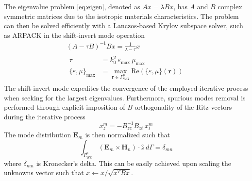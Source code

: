 \documentclass[journal,twoside,letterpaper]{IEEEtran}
\renewcommand{\vec}[1]{\mathbf{#1}}
\begin{document}
The eigenvalue problem \eqref{eq:eigen}, denoted as $A x = \lambda B x$, has $A$ and $B$ complex symmetric matrices due to the isotropic materials characteristics. The problem can then be solved efficiently with a Lanczos-based Krylov subspace solver, such as ARPACK in the shift-invert mode operation \cite{Farle2004}
%
\begin{gather*}
\left( A-\tau B \right)^{-1} B x =  \frac{1}{\lambda-\tau} x\\
\begin{aligned}
\tau &= k_0^2 \ \varepsilon_\text{max} \ \mu_\text{max} \\
\{\varepsilon,\mu\}_\text{max} &= \max\limits_{\vec{r}\in\Gamma_\text{WG}^p} \text{Re}\left( \{\varepsilon,\mu\}(\vec{r}) \right) 
\end{aligned} \nonumber
\end{gather*}
%
\noindent The shift-invert mode expedites the convergence of the employed iterative process when seeking for the largest eigenvalues. Furthermore, spurious modes removal is performed through explicit imposition of $B$-orthogonality of the Ritz vectors during the iterative process
%
\begin{equation*}
x_z^m  = - B_{zz}^{-1} B_{zt} \ x_t^m
\end{equation*}
%
The mode distribution $\vec{E}_m$ is then normalized such that
%
\begin{equation}
\label{eq:pow}
\int_{\Gamma_\text{WG}^{p}} \left( \vec{E}_{m}  \times  \vec{H}_n \right) \cdot \hat{z} \ d\Gamma = \delta_{mn}
\end{equation}
%
\noindent where $\delta_{mn}$ is Kronecker's delta. This can be easily achieved upon scaling the unknowns vector such that $x\leftarrow{x}/{\sqrt{ x^T B x}}$.
\end{document}
